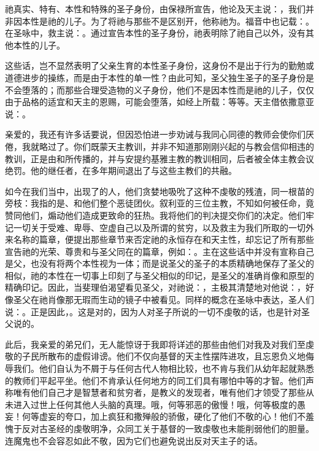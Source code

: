 祂真实、特有、本性和特殊的圣子身份，由保禄所宣告，他论及天主说：，我们并非因本性是祂的儿子。为了将祂与那些不是区别开，他称祂为。福音中也记载：。在圣咏中，救主说：。通过宣告本性的圣子身份，祂表明除了祂自己以外，没有其他本性的儿子。\par

这些话，岂不显然表明了父亲生育的本性圣子身份，这身份不是出于行为的勤勉或道德进步的操练，而是由于本性的单一性？由此可知，圣父独生圣子的圣子身份是不会堕落的；而那些合理受造物的义子身份，他们不是因本性而是祂的儿子，仅仅由于品格的适宜和天主的恩赐，可能会堕落，如经上所载：等等。天主借依撒意亚说：。\par

亲爱的，我还有许多话要说，但因恐怕进一步劝诫与我同心同德的教师会使你们厌倦，我就略过了。你们既蒙天主教训，并非不知道那刚刚兴起的与教会信仰相违的教训，正是由和所传播的，并与安提约基雅主教的教训相同，后者被全体主教会议绝罚。他的继任者，在多年期间退出了与这些主教们的共融。\par

如今在我们当中，出现了的人，他们贪婪地吸吮了这种不虔敬的残渣，同一根苗的旁枝：我指的是、和他们整个恶徒团伙。叙利亚的三位主教，不知如何被任命，竟赞同他们，煽动他们造成更致命的狂热。我将他们的判决提交你们的决定。他们牢记一切关于受难、卑辱、空虚自己以及所谓的贫穷，以及救主为我们所取的一切外来名称的篇章，便提出那些章节来否定祂的永恒存在和天主性，却忘记了所有那些宣告祂的光荣、尊贵和与圣父同在的篇章，例如：。主在这些话中并没有宣称自己是父，也没有将两个本性视为一体；而是说圣父的圣子的本质精确地保存了圣父的相似，祂的本性在一切事上印刻了与圣父相似的印记，是圣父的准确肖像和原型的精确印记。因此，当斐理伯渴望看见圣父，对祂说：，主极其清楚地对他说：，好像圣父在祂肖像那无瑕而生动的镜子中被看见。同样的概念在圣咏中表达，圣人们说：。正是因此，。这是对的，因为人对圣子所说的一切不虔敬的话，也是针对圣父说的。\par

此后，我亲爱的弟兄们，无人能惊讶于我即将详述的那些由他们对我及对我们至虔敬的子民所散布的虚假诽谤。他们不仅向基督的天主性摆阵进攻，且忘恩负义地侮辱我们。他们自认为不屑于与任何古代人物相比较，也不肯与我们从幼年起就熟悉的教师们平起平坐。他们不肯承认任何地方的同工们具有哪怕中等的才智。他们声称唯有他们自己才是智慧者和贫穷者，是教义的发现者，唯有他们才领受了那些从未进入过世上任何其他人头脑的真理。哦，何等邪恶的傲慢！哦，何等极度的愚妄！何等虚妄的夸口，加上疯狂和撒殚般的骄傲，硬化了他们不敬的心！他们不羞愧于反对古圣经的虔敬明净，众同工关于基督的一致虔敬也未能削弱他们的胆量。连魔鬼也不会容忍如此不敬，因为它们也避免说出反对天主子的话。\par

